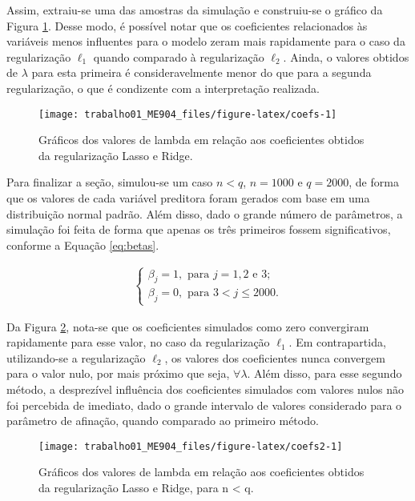 \documentclass[
  12pt,
]{article}
\begin{document}
\quad Assim, extraiu-se uma das amostras da simulação e construiu-se o
gráfico da Figura \ref{fig:coefs}. Desse modo, é possível notar que os
coeficientes relacionados às variáveis menos influentes para o modelo
zeram mais rapidamente para o caso da regularização \(\ell_1\) quando
comparado à regularização \(\ell_2\). Ainda, o valores obtidos de
\(\lambda\) para esta primeira é consideravelmente menor do que para a
segunda regularização, o que é condizente com a interpretação realizada.

\begin{figure}

{\centering \texttt{[image: trabalho01\_ME904\_files/figure-latex/coefs-1]} 

}

\caption{Gráficos dos valores de lambda em relação aos coeficientes obtidos da regularização Lasso e Ridge.}\label{fig:coefs}
\end{figure}

\newpage

\quad Para finalizar a seção, simulou-se um caso \(n<q\), \(n = 1000\) e
\(q = 2000\), de forma que os valores de cada variável preditora foram
gerados com base em uma distribuição normal padrão. Além disso, dado o
grande número de parâmetros, a simulação foi feita de forma que apenas
os três primeiros fossem significativos, conforme a Equação
\ref{eq:betas}.

\begin{eqnarray}
\label{eq:betas}
\begin{cases}
\beta_j = 1, \text{ para } j = 1, 2 \text{ e } 3; \\
\beta_j = 0, \text{ para } 3 < j \leq 2000.
\end{cases}
\end{eqnarray}

\quad Da Figura \ref{fig:coefs2}, nota-se que os coeficientes simulados
como zero convergiram rapidamente para esse valor, no caso da
regularização \(\ell_1\). Em contrapartida, utilizando-se a
regularização \(\ell_2\), os valores dos coeficientes nunca convergem
para o valor nulo, por mais próximo que seja, \(\forall \lambda\). Além
disso, para esse segundo método, a desprezível influência dos
coeficientes simulados com valores nulos não foi percebida de imediato,
dado o grande intervalo de valores considerado para o parâmetro de
afinação, quando comparado ao primeiro método.

\begin{figure}

{\centering \texttt{[image: trabalho01\_ME904\_files/figure-latex/coefs2-1]} 

}

\caption{Gráficos dos valores de lambda em relação aos coeficientes obtidos da regularização Lasso e Ridge, para n < q.}\label{fig:coefs2}
\end{figure}
\end{document}

